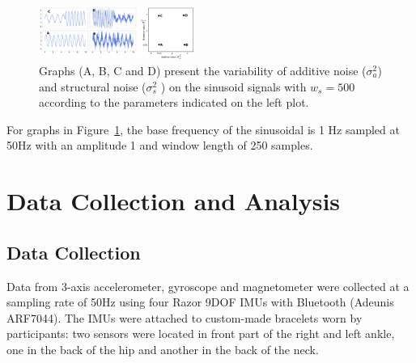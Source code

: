 \documentclass[10pt,journal,compsoc]{IEEEtran}
\begin{document}
\begin{figure}[!htb]
\centering \includegraphics[width=0.45\textwidth]{impactofnoise01}
\caption[PA]{Graphs (A, B, C and D) present the variability of additive noise
  ($\sigma_a ^2$) and structural noise ($\sigma_s ^2$ ) on the sinusoid signals
  with $w_s=500$ according to the parameters indicated on the left plot.}
\label{fig:sn}
\end{figure}

For graphs in Figure~\ref{fig:sn}, the base frequency of the sinusoidal is 1 Hz
sampled at 50Hz with an amplitude 1 and window length of 250 samples.


\section{Data Collection and Analysis}
\subsection{Data Collection}
Data from 3-axis accelerometer, gyroscope and magnetometer
were collected at a sampling rate of 50Hz using four
Razor 9DOF IMUs with Bluetooth (Adeunis ARF7044). The
IMUs were attached to custom-made bracelets worn by
participants: two sensors were located in front part of the
right and left ankle, one in the back of the hip and another
in the back of the neck.
\end{document}
